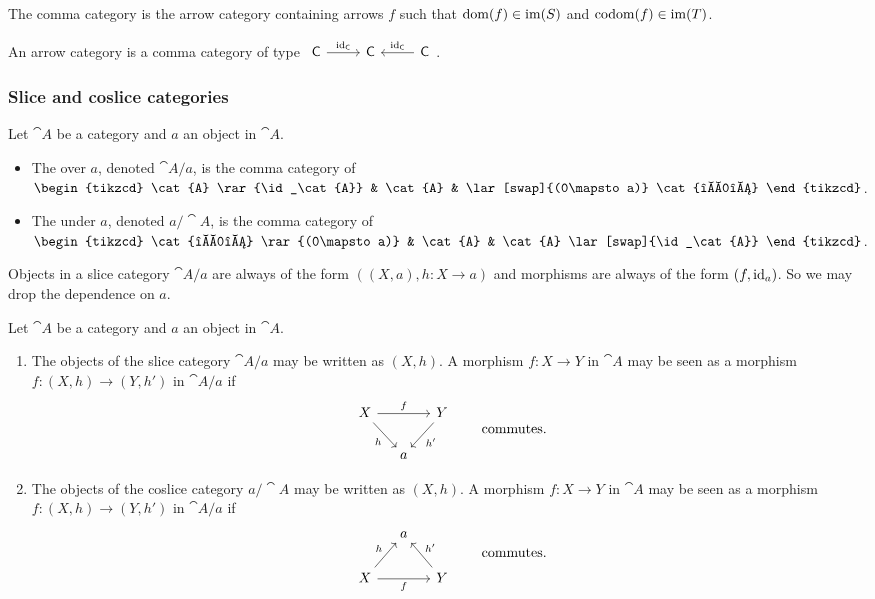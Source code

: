The comma category is the arrow category containing arrows $f$ such that $\operatorname{dom}(f)\in\operatorname{im}(S)$ and $\operatorname{codom}(f)\in \operatorname{im}(T)$.

\begin{lemma}
An arrow category is a comma category of type $\begin{tikzcd}
\cat{C} \ar[r, "\id_\cat{C}"] & \cat{C} & \lar[swap]{\id_\cat{C}} \cat{C}
\end{tikzcd}$.
\end{lemma}


\subsubsection{Slice and coslice categories}
\begin{definition}
Let $\cat{A}$ be a category and $a$ an object in $\cat{A}$.
\begin{itemize}
\item The  over $a$, denoted $\cat{A}/a$, is the comma category of $\begin{tikzcd}
\cat{A} \rar{\id_\cat{A}} & \cat{A} & \lar[swap]{(0\mapsto a)} \cat{\mathbb{1}}
\end{tikzcd}$.
\item The  under $a$, denoted $a/\cat{A}$, is the comma category of $\begin{tikzcd}
\cat{\mathbb{1}} \rar{(0\mapsto a)} & \cat{A} & \cat{A} \lar[swap]{\id_\cat{A}} 
\end{tikzcd}$.
\end{itemize}
\end{definition}

Objects in a slice category $\cat{A}/a$ are always of the form $((X, a),h: X\to a)$ and morphisms are always of the form $(f, \operatorname{id}_a)$. So we may drop the dependence on $a$.
\begin{lemma}
Let $\cat{A}$ be a category and $a$ an object in $\cat{A}$.
\begin{enumerate}
\item The objects of the slice category $\cat{A}/a$ may be written as $(X,h)$. A morphism $f: X\to Y$ in $\cat{A}$ may be seen as a morphism $f: (X, h) \to (Y, h')$ in $\cat{A}/a$ if
\[ \begin{tikzcd}[column sep=small]
X \ar[rr, "f"]\arrow[dr, swap, "h"]& & Y \arrow[dl, "h'"]  \\
& a &
\end{tikzcd} \qquad\text{commutes.} \]
\item The objects of the coslice category $a/\cat{A}$ may be written as $(X,h)$. A morphism $f: X\to Y$ in $\cat{A}$ may be seen as a morphism $f: (X, h) \to (Y, h')$ in $\cat{A}/a$ if
\[ \begin{tikzcd}[column sep=small]
& a & \\
X \ar[rr, swap, "f"]\ar[ur, "h"]& & Y \ar[ul, swap, "h'"] 
\end{tikzcd} \qquad\text{commutes.} \]
\end{enumerate}
\end{lemma}



